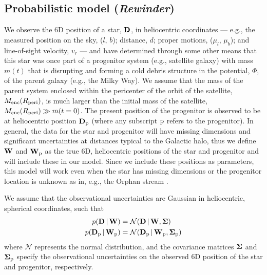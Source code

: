 \documentclass[letterpaper,12pt,preprint]{aastex}
\newcommand{\given}{\,|\,}
\newcommand{\D}{{\bf D}}
\newcommand{\W}{{\bf W}}
\newcommand{\bSigma}{{\bf \Sigma}}
\newcommand{\sat}{{\rm p}}
\newcommand{\rewinder}{\emph{Rewinder}}
\begin{document}
\subsection{Probabilistic model (\rewinder)}
We observe the 6D position of a star, $\D$, in heliocentric coordinates --- e.g., the measured position on the sky, ($l$, $b$); distance, $d$; proper motions, ($\mu_l$, $\mu_b$); and line-of-sight velocity, $v_r$ --- and have determined through some other means that this star was once part of a progenitor system (e.g., satellite galaxy) with mass $m(t)$ that is disrupting and forming a cold debris structure in the potential, $\Phi$, of the parent galaxy (e.g., the Milky Way). We assume that the mass of the parent system enclosed within the pericenter of the orbit of the satellite, $M_{\rm enc}(R_{\rm peri})$, is much larger than the initial mass of the satellite, $M_{\rm enc}(R_{\rm peri})\gg m(t=0)$. The present position of the progenitor is observed to be at heliocentric position $\D_\sat$ (where any subscript $\sat$ refers to the progenitor). In general, the data for the star and progenitor will have missing dimensions and significant uncertainties at distances typical to the Galactic halo, thus we define $\W$ and $\W_\sat$ as the true 6D, heliocentric positions of the star and progenitor and will include these in our model. Since we include these positions as parameters, this model will work even when the star has missing dimensions or the progenitor location is unknown as in, e.g., the Orphan stream \citep{belokurov07}.

We assume that the observational uncertainties are Gaussian in heliocentric, spherical coordinates, such that
\begin{align}
	p(\D \given \W) &= \mathcal{N}(\D \given \W, \bSigma)\label{eq:obsstar}\\
	p(\D_\sat \given \W_\sat) &= \mathcal{N}(\D_\sat \given \W_\sat, \bSigma_\sat)\label{eq:obsprog}
\end{align}
where $\mathcal{N}$ represents the normal distribution, and the covariance matrices $\bSigma$ and $\bSigma_\sat$ specify the observational uncertainties on the observed 6D position of the star and progenitor, respectively. 
\end{document}
